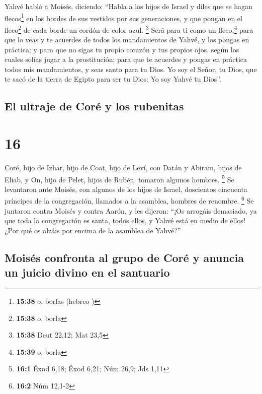  Yahvé habló a Moisés, diciendo:  ``Habla
a los hijos de Israel y diles que se hagan flecos\footnote{\textbf{15:38}
  o, borlas (hebreo )} en los bordes de sus vestidos por
sus generaciones, y que pongan en el fleco\footnote{\textbf{15:38} o,
  borla} de cada borde un cordón de color azul. \footnote{\textbf{15:38}
  Deut 22,12; Mat 23,5}  Será para ti como un
fleco,\footnote{\textbf{15:39} o, borla} para que lo veas y te acuerdes
de todos los mandamientos de Yahvé, y los pongas en práctica; y para que
no sigas tu propio corazón y tus propios ojos, según los cuales solías
jugar a la prostitución;  para que te acuerdes y pongas
en práctica todos mis mandamientos, y seas santo para tu Dios.
 Yo soy el Señor, tu Dios, que te sacó de la tierra de
Egipto para ser tu Dios: Yo soy Yahvé tu Dios''.

\hypertarget{el-ultraje-de-coruxe9-y-los-rubenitas}{%
\subsection{El ultraje de Coré y los
rubenitas}\label{el-ultraje-de-coruxe9-y-los-rubenitas}}

\hypertarget{section-15}{%
\section{16}\label{section-15}}

 Coré, hijo de Izhar, hijo de Coat, hijo de Leví, con
Datán y Abiram, hijos de Eliab, y On, hijo de Pelet, hijos de Rubén,
tomaron algunos hombres. \footnote{\textbf{16:1} Éxod 6,18; Éxod 6,21;
  Núm 26,9; Jds 1,11}  Se levantaron ante Moisés, con
algunos de los hijos de Israel, doscientos cincuenta príncipes de la
congregación, llamados a la asamblea, hombres de renombre. \footnote{\textbf{16:2}
  Núm 12,1-2}  Se juntaron contra Moisés y contra Aarón, y
les dijeron: ``¡Os arrogáis demasiado, ya que toda la congregación es
santa, todos ellos, y Yahvé está en medio de ellos! ¿Por qué os alzáis
por encima de la asamblea de Yahvé?''

\hypertarget{moisuxe9s-confronta-al-grupo-de-coruxe9-y-anuncia-un-juicio-divino-en-el-santuario}{%
\subsection{Moisés confronta al grupo de Coré y anuncia un juicio divino
en el
santuario}\label{moisuxe9s-confronta-al-grupo-de-coruxe9-y-anuncia-un-juicio-divino-en-el-santuario}}

